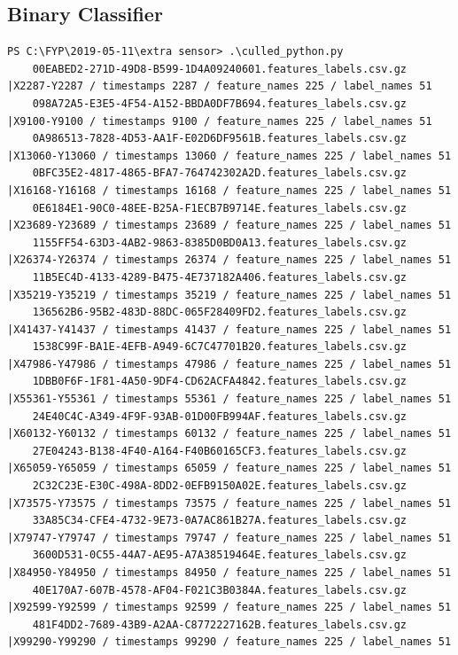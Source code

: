 \documentclass{UoNMCHA}
\numberwithin{equation}{section}
\begin{document}
\subsection{Binary Classifier}
\begin{lstlisting}[breaklines=true]
    PS C:\FYP\2019-05-11\extra sensor> .\culled_python.py
    00EABED2-271D-49D8-B599-1D4A09240601.features_labels.csv.gz |X2287-Y2287 / timestamps 2287 / feature_names 225 / label_names 51
    098A72A5-E3E5-4F54-A152-BBDA0DF7B694.features_labels.csv.gz |X9100-Y9100 / timestamps 9100 / feature_names 225 / label_names 51
    0A986513-7828-4D53-AA1F-E02D6DF9561B.features_labels.csv.gz |X13060-Y13060 / timestamps 13060 / feature_names 225 / label_names 51
    0BFC35E2-4817-4865-BFA7-764742302A2D.features_labels.csv.gz |X16168-Y16168 / timestamps 16168 / feature_names 225 / label_names 51
    0E6184E1-90C0-48EE-B25A-F1ECB7B9714E.features_labels.csv.gz |X23689-Y23689 / timestamps 23689 / feature_names 225 / label_names 51
    1155FF54-63D3-4AB2-9863-8385D0BD0A13.features_labels.csv.gz |X26374-Y26374 / timestamps 26374 / feature_names 225 / label_names 51
    11B5EC4D-4133-4289-B475-4E737182A406.features_labels.csv.gz |X35219-Y35219 / timestamps 35219 / feature_names 225 / label_names 51
    136562B6-95B2-483D-88DC-065F28409FD2.features_labels.csv.gz |X41437-Y41437 / timestamps 41437 / feature_names 225 / label_names 51
    1538C99F-BA1E-4EFB-A949-6C7C47701B20.features_labels.csv.gz |X47986-Y47986 / timestamps 47986 / feature_names 225 / label_names 51
    1DBB0F6F-1F81-4A50-9DF4-CD62ACFA4842.features_labels.csv.gz |X55361-Y55361 / timestamps 55361 / feature_names 225 / label_names 51
    24E40C4C-A349-4F9F-93AB-01D00FB994AF.features_labels.csv.gz |X60132-Y60132 / timestamps 60132 / feature_names 225 / label_names 51
    27E04243-B138-4F40-A164-F40B60165CF3.features_labels.csv.gz |X65059-Y65059 / timestamps 65059 / feature_names 225 / label_names 51
    2C32C23E-E30C-498A-8DD2-0EFB9150A02E.features_labels.csv.gz |X73575-Y73575 / timestamps 73575 / feature_names 225 / label_names 51
    33A85C34-CFE4-4732-9E73-0A7AC861B27A.features_labels.csv.gz |X79747-Y79747 / timestamps 79747 / feature_names 225 / label_names 51
    3600D531-0C55-44A7-AE95-A7A38519464E.features_labels.csv.gz |X84950-Y84950 / timestamps 84950 / feature_names 225 / label_names 51
    40E170A7-607B-4578-AF04-F021C3B0384A.features_labels.csv.gz |X92599-Y92599 / timestamps 92599 / feature_names 225 / label_names 51
    481F4DD2-7689-43B9-A2AA-C8772227162B.features_labels.csv.gz |X99290-Y99290 / timestamps 99290 / feature_names 225 / label_names 51

\end{lstlisting}
\end{document}
